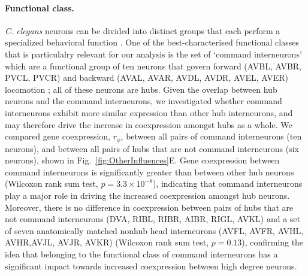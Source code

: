 \documentclass[10pt,letterpaper]{article}
\begin{document}
{\paragraph{Functional class.}
\emph{C. elegans} neurons can be divided into distinct groups that each perform a specialized behavioral function \cite{Hobert2003}.
One of the best-characterised functional classes that is particulalry relevant for our analysis is the set of `command interneurons' which are a functional group of ten neurons that govern forward (AVBL, AVBR, PVCL, PVCR) and backward (AVAL, AVAR, AVDL, AVDR, AVEL, AVER) locomotion \cite{Rakowski2013}; all of these neurons are hubs.
Given the overlap between hub neurons and the command interneurons, we investigated whether command interneurons exhibit more similar expression than other hub interneurons, and may therefore drive the increase in coexpression amongst hubs as a whole.
We compared gene coexpression, $r_\phi$, between all pairs of command interneurons (ten neurons), and between all pairs of hubs that are not command interneurons (six neurons), shown in Fig.~\ref{fig:OtherInfluences}E.
Gene coexpression between command interneurons is significantly greater than between other hub neurons (Wilcoxon rank sum test, $p = 3.3 \times 10^{-8}$), indicating that command interneurons play a major role in driving the increased coexpression amongst hub neurons.
Moreover, there is no difference in coexpression between pairs of hubs that are not command interneurons (DVA, RIBL, RIBR, AIBR, RIGL, AVKL) and a set of seven anatomically matched nonhub head interneurons (AVFL, AVFR, AVHL, AVHR,AVJL, AVJR, AVKR) (Wilcoxon rank sum test, $p = 0.13$), confirming the idea that belonging to the functional class of command interneurons has a significant impact towards increased coexpression between high degree neurons.



}
\end{document}
